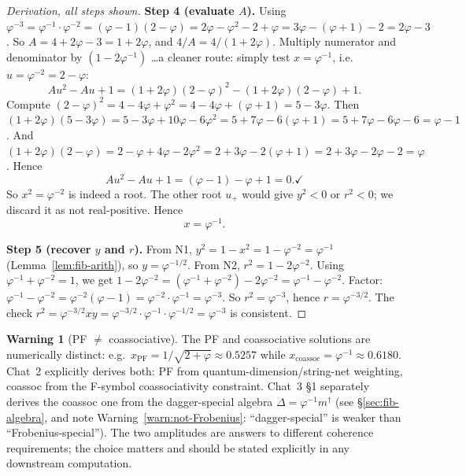 \documentclass[11pt,a4paper]{article}
\theoremstyle{definition}
\newtheorem{warning}[definition]{Warning}
\begin{document}
\begin{proof}[Derivation, all steps shown]
\textbf{Step 4 (evaluate $A$).} Using
$\varphi^{-3} = \varphi^{-1}\cdot\varphi^{-2} = (\varphi-1)(2-\varphi)
= 2\varphi - \varphi^{2} - 2 + \varphi = 3\varphi - (\varphi+1) - 2
= 2\varphi - 3$. So $A = 4 + 2\varphi - 3 = 1 + 2\varphi$, and
$4/A = 4/(1+2\varphi)$. Multiply numerator and denominator by
$(1-2\varphi^{-1})$ \dots a cleaner route: simply test $x = \varphi^{-1}$,
i.e.\ $u = \varphi^{-2} = 2-\varphi$:
\[
A u^{2} - A u + 1
= (1+2\varphi)(2-\varphi)^{2} - (1+2\varphi)(2-\varphi) + 1.
\]
Compute $(2-\varphi)^{2} = 4 - 4\varphi + \varphi^{2}
= 4 - 4\varphi + (\varphi+1) = 5 - 3\varphi$. Then
$(1+2\varphi)(5-3\varphi) = 5 - 3\varphi + 10\varphi - 6\varphi^{2}
= 5 + 7\varphi - 6(\varphi+1) = 5 + 7\varphi - 6\varphi - 6 = \varphi - 1$.
And $(1+2\varphi)(2-\varphi) = 2 - \varphi + 4\varphi - 2\varphi^{2}
= 2 + 3\varphi - 2(\varphi+1) = 2 + 3\varphi - 2\varphi - 2 = \varphi$.
Hence
\[
Au^{2}-Au+1 = (\varphi - 1) - \varphi + 1 = 0. \checkmark
\]
So $x^{2} = \varphi^{-2}$ is indeed a root. The other root $u_{+}$ would give
$y^{2}<0$ or $r^{2}<0$; we discard it as not real-positive. Hence
\[
x = \varphi^{-1}.
\]

\textbf{Step 5 (recover $y$ and $r$).} From N1,
$y^{2} = 1 - x^{2} = 1 - \varphi^{-2} = \varphi^{-1}$ (Lemma~\ref{lem:fib-arith}),
so $y = \varphi^{-1/2}$.
From N2, $r^{2} = 1 - 2\varphi^{-2}$. Using
$\varphi^{-1}+\varphi^{-2}=1$, we get
$1 - 2\varphi^{-2} = (\varphi^{-1}+\varphi^{-2}) - 2\varphi^{-2}
= \varphi^{-1}-\varphi^{-2}$. Factor:
$\varphi^{-1}-\varphi^{-2} = \varphi^{-2}(\varphi - 1) = \varphi^{-2}\cdot\varphi^{-1}
= \varphi^{-3}$. So $r^{2} = \varphi^{-3}$, hence $r = \varphi^{-3/2}$.
The check $r^{2} = \varphi^{-3/2}xy = \varphi^{-3/2}\cdot\varphi^{-1}\cdot\varphi^{-1/2}
= \varphi^{-3}$ is consistent.
\end{proof}

\begin{warning}[PF $\neq$ coassociative]\label{warn:PF-coassoc}
The PF and coassociative solutions are numerically distinct: e.g.\
$x_{\mathrm{PF}} = 1/\sqrt{2+\varphi} \approx 0.5257$ while
$x_{\mathrm{coassoc}} = \varphi^{-1} \approx 0.6180$. Chat~2 explicitly
derives both: PF from quantum-dimension/string-net weighting, coassoc from
the F-symbol coassociativity constraint. Chat~3 \S1 separately derives the
coassoc one from the dagger-special algebra
$\Delta = \varphi^{-1}m^\dagger$ (see \S\ref{sec:fib-algebra}, and note
Warning~\ref{warn:not-Frobenius}: ``dagger-special'' is weaker than
``Frobenius-special''). The two amplitudes are answers to different
coherence requirements; the choice matters and should be stated explicitly
in any downstream computation.
\end{warning}
\end{document}

